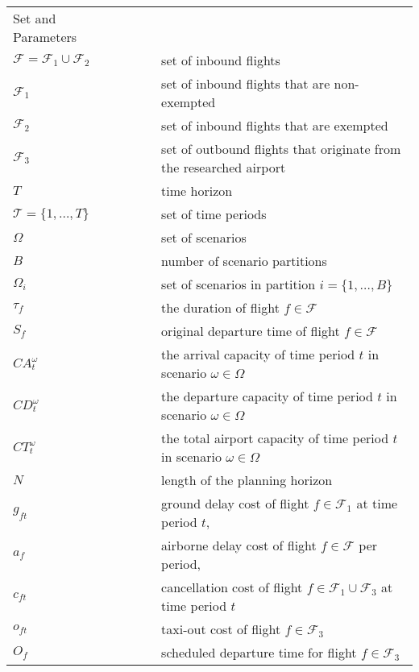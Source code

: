 \documentclass[12pt]{article}
\begin{document}
	\begin{longtable}[H]{l l l}
		Set and Parameters & &\\
		\(\mathcal{F} = \mathcal{F}_1 \cup \mathcal{F}_2\) & \(\qquad\)& set of inbound flights\\
		\(\mathcal{F}_1\) & \(\qquad\)& set of inbound flights that are non-exempted\\
		\(\mathcal{F}_2\) & \(\qquad\)& set of inbound flights that are exempted\\
		\(\mathcal{F}_3\) & \(\qquad\)& set of outbound flights that originate from the researched airport\\
		\(T\) & \(\qquad\) & time horizon\\
		\(\mathcal{T} = \{1, \dots,T\}\) & \(\qquad\) & set of time periods\\
		\(\Omega\) & \(\qquad\) & set of scenarios\\
		\(B\) & \(\qquad\) & number of scenario partitions \\
		\(\Omega_i\) & \(\qquad\) & set of scenarios in partition \(i = \{1, \dots, B\}\)\\
		\(\tau_f\) & \(\qquad\) & the duration of flight \(f \in \mathcal{F}\)\\
		\(S_f\) & \(\qquad\) & original departure time of flight \(f\in \mathcal{F}\)\\
		\(CA_t^\omega\)  & \(\qquad\) & the arrival capacity of time period \(t\) in scenario \(\omega \in \Omega\)\\
		\(CD_t^\omega\)  & \(\qquad\) & the departure capacity of time period \(t\) in scenario \(\omega \in \Omega\)\\
		\(CT_t^\omega\)  & \(\qquad\) & the total airport capacity of time period \(t\) in scenario \(\omega \in \Omega\)\\
		\(N\) & \(\qquad\) & length of the planning horizon \\
		\(g_{ft}\) & \(\qquad\) & ground delay cost of flight \(f \in \mathcal{F}_1\) at time period \(t\), \\
		\(a_{f}\) & \(\qquad\) & airborne delay cost of flight \(f \in \mathcal{F}\) per period, \\
		\(c_{ft}\) & \(\qquad\) & cancellation cost of flight \(f \in \mathcal{F}_1 \cup \mathcal{F}_3\) at time period \(t\)\\
		\(o_{ft}\) & \(\qquad\) & taxi-out cost of flight \(f \in \mathcal{F}_3\)\\
		\(O_{f}\) & \(\qquad\) & scheduled departure time for flight \(f \in \mathcal{F}_3\)\\

\end{longtable}
\end{document}
